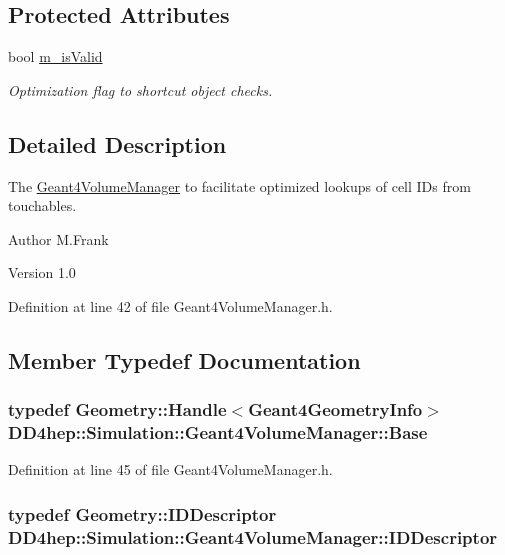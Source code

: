 \subsection*{Protected Attributes}
\begin{DoxyCompactItemize}
\item 
bool \hyperlink{class_d_d4hep_1_1_simulation_1_1_geant4_volume_manager_abbc8ba6689ff382f2803382ccaf3d6d6}{m\_\-isValid}
\begin{DoxyCompactList}\small\item\em Optimization flag to shortcut object checks. \item\end{DoxyCompactList}\end{DoxyCompactItemize}


\subsection{Detailed Description}
The \hyperlink{class_d_d4hep_1_1_simulation_1_1_geant4_volume_manager}{Geant4VolumeManager} to facilitate optimized lookups of cell IDs from touchables. \begin{DoxyAuthor}{Author}
M.Frank 
\end{DoxyAuthor}
\begin{DoxyVersion}{Version}
1.0 
\end{DoxyVersion}


Definition at line 42 of file Geant4VolumeManager.h.

\subsection{Member Typedef Documentation}
\hypertarget{class_d_d4hep_1_1_simulation_1_1_geant4_volume_manager_a7c19ae032d35b5c68d35029f28fc1586}{
\subsubsection[{Base}]{\setlength{\rightskip}{0pt plus 5cm}typedef {\bf Geometry::Handle}$<${\bf Geant4GeometryInfo}$>$ {\bf DD4hep::Simulation::Geant4VolumeManager::Base}}}
\label{class_d_d4hep_1_1_simulation_1_1_geant4_volume_manager_a7c19ae032d35b5c68d35029f28fc1586}


Definition at line 45 of file Geant4VolumeManager.h.\hypertarget{class_d_d4hep_1_1_simulation_1_1_geant4_volume_manager_af539708bee7b18130b2052cb92da0822}{
\subsubsection[{IDDescriptor}]{\setlength{\rightskip}{0pt plus 5cm}typedef {\bf Geometry::IDDescriptor} {\bf DD4hep::Simulation::Geant4VolumeManager::IDDescriptor}}}
\label{class_d_d4hep_1_1_simulation_1_1_geant4_volume_manager_af539708bee7b18130b2052cb92da0822}


